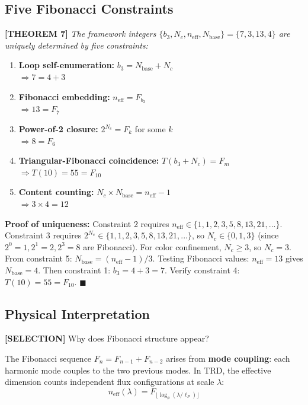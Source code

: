 \documentclass[aps,prd,twocolumn,10pt,groupedaddress,superscriptaddress]{revtex4-2}
\begin{document}
\subsection{Five Fibonacci Constraints}

\textbf{[THEOREM 7]} \textit{The framework integers $\{b_3, N_c, n_{\text{eff}}, N_{\text{base}}\} = \{7, 3, 13, 4\}$ are uniquely determined by five constraints:}

\begin{enumerate}
\item \textbf{Loop self-enumeration:} $b_3 = N_{\text{base}} + N_c$ \\
$\Rightarrow 7 = 4 + 3$

\item \textbf{Fibonacci embedding:} $n_{\text{eff}} = F_{b_3}$ \\
$\Rightarrow 13 = F_7$

\item \textbf{Power-of-2 closure:} $2^{N_c} = F_k$ for some $k$ \\
$\Rightarrow 8 = F_6$

\item \textbf{Triangular-Fibonacci coincidence:} $T(b_3 + N_c) = F_m$ \\
$\Rightarrow T(10) = 55 = F_{10}$

\item \textbf{Content counting:} $N_c \times N_{\text{base}} = n_{\text{eff}} - 1$ \\
$\Rightarrow 3 \times 4 = 12$
\end{enumerate}

\textbf{Proof of uniqueness:} Constraint 2 requires $n_{\text{eff}} \in \{1, 1, 2, 3, 5, 8, 13, 21, ...\}$. Constraint 3 requires $2^{N_c} \in \{1, 1, 2, 3, 5, 8, 13, 21, ...\}$, so $N_c \in \{0, 1, 3\}$ (since $2^0=1, 2^1=2, 2^3=8$ are Fibonacci). For color confinement, $N_c \geq 3$, so $N_c = 3$. From constraint 5: $N_{\text{base}} = (n_{\text{eff}} - 1)/3$. Testing Fibonacci values: $n_{\text{eff}} = 13$ gives $N_{\text{base}} = 4$. Then constraint 1: $b_3 = 4 + 3 = 7$. Verify constraint 4: $T(10) = 55 = F_{10}$. $\blacksquare$

\subsection{Physical Interpretation}

\textbf{[SELECTION]} Why does Fibonacci structure appear?

The Fibonacci sequence $F_n = F_{n-1} + F_{n-2}$ arises from \textbf{mode coupling}: each harmonic mode couples to the two previous modes. In TRD, the effective dimension counts independent flux configurations at scale $\lambda$:
\begin{equation}
n_{\text{eff}}(\lambda) = F_{\lfloor \log_\phi(\lambda/\ell_P) \rfloor}
\end{equation}
\end{document}
